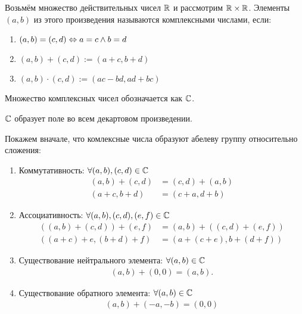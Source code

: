\documentclass{article}
\begin{document}


Возьмём множество действительных чисел $\mathbb{R}$ и рассмотрим $\mathbb{R} \times \mathbb{R}$. Элементы $(a,b)$ из этого произведения называются комплексными числами, если:

\begin{enumerate}
	\item{}$(a,b)=(c,d)\Leftrightarrow a=c\land b=d$
	\item{}$(a,b)+(c,d):=(a+c,b+d)$
	\item{}$(a,b)\cdot(c,d):=(ac-bd,ad+bc)$
\end{enumerate}

Множество комплексных чисел обозначается как $\mathbb{C}$.

\theorem

$\mathbb{C}$ образует поле во всем декартовом произведении.

\proof

Покажем вначале, что комлексные числа образуют абелеву группу относительно сложения:
\begin{enumerate}
	\item{}Коммутативность: $\forall (a,b),(c,d)\in\mathbb{C}$
	\begin{align*}
		(a,b) + (c,d) & = (c,d) + (a,b) \\
		(a+c,b+d)     & =(c+a,d+b)
	\end{align*}

	\item{}Ассоциативность: $\forall (a,b),(c,d),(e,f)\in\mathbb{C}$
	\begin{align*}
		((a,b) + (c,d)) + (e,f) & = (a,b) + ((c,d) + (e,f)) \\
		((a+c)+e,(b+d)+f)       & =(a+(c+e),b+(d+f))
	\end{align*}

	\item{}Существование нейтрального элемента: $\forall (a,b)\in\mathbb{C}$
	\begin{align*}
		(a,b) + (0,0) = (a,b).
	\end{align*}

	\item{}Существование обратного элемента: $\forall (a,b)\in\mathbb{C}$
	\begin{align*}
		(a,b)+(-a,-b)=(0,0)
	\end{align*}
\end{enumerate}
\end{document}
